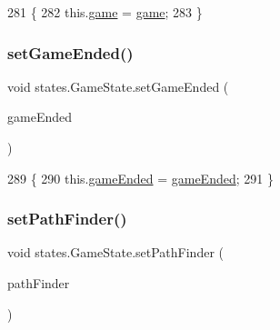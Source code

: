 \begin{DoxyCode}
281                                              \{
282         this.\mbox{\hyperlink{classstates_1_1_game_state_a5f563e34a3fc7d777396b68e00b321f5}{game}} = \mbox{\hyperlink{classstates_1_1_game_state_a5f563e34a3fc7d777396b68e00b321f5}{game}};
283     \}
\end{DoxyCode}
\mbox{\label{classstates_1_1_game_state_acdafba6555f9ca9a6ce73f2b385d3e9a}} 
\subsubsection{\texorpdfstring{set\+Game\+Ended()}{setGameEnded()}}
{\footnotesize\ttfamily void states.\+Game\+State.\+set\+Game\+Ended (\begin{DoxyParamCaption}\item[{boolean}]{game\+Ended }\end{DoxyParamCaption})\hspace{0.3cm}{\ttfamily [inline]}}


\begin{DoxyCode}
289                                                 \{
290         this.\mbox{\hyperlink{classstates_1_1_game_state_a67de2baaf7f13d4c875e9b34a54fed5e}{gameEnded}} = \mbox{\hyperlink{classstates_1_1_game_state_a67de2baaf7f13d4c875e9b34a54fed5e}{gameEnded}};
291     \}
\end{DoxyCode}
\mbox{\label{classstates_1_1_game_state_a8df71c0f666c07222b9d6314c2ee0c26}} 
\subsubsection{\texorpdfstring{set\+Path\+Finder()}{setPathFinder()}}
{\footnotesize\ttfamily void states.\+Game\+State.\+set\+Path\+Finder (\begin{DoxyParamCaption}\item[{\mbox{\hyperlink{classentities_1_1_path_finder}{Path\+Finder}}}]{path\+Finder }\end{DoxyParamCaption})\hspace{0.3cm}{\ttfamily [inline]}}


